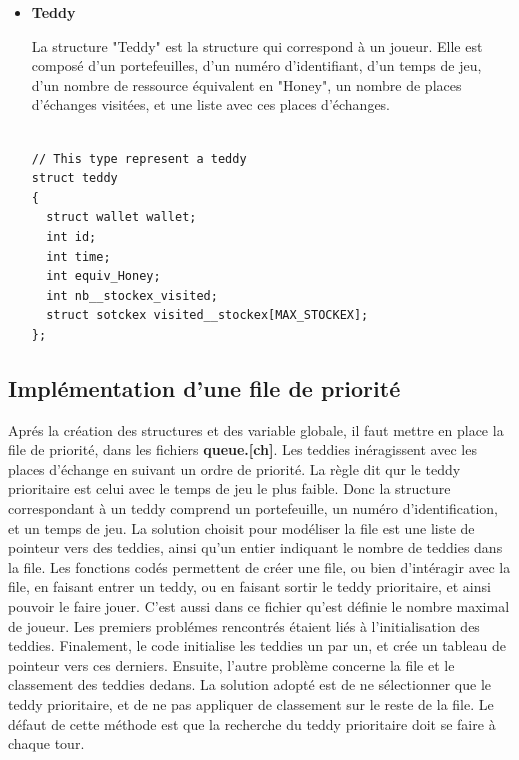 \documentclass{article}
\begin{document}
\begin{itemize}
\begin{lstlisting}
// This type represent a queue
struct queue
{
  struct teddy* list[MAX_PLYR]; 
  int nbr_of_teddies;
};
\end{lstlisting}

\item\textbf{Teddy}

La structure "Teddy" est la structure qui correspond \`a un joueur.
Elle est compos\'e d'un portefeuilles, d'un num\'ero d'identifiant, d'un temps de jeu, d'un nombre de ressource \'equivalent en "Honey", 
un nombre de places d'\'echanges visit\'ees, et une liste avec ces places d'\'echanges.

\begin{lstlisting}

// This type represent a teddy
struct teddy
{
  struct wallet wallet;
  int id;
  int time;
  int equiv_Honey;
  int nb__stockex_visited;
  struct sotckex visited__stockex[MAX_STOCKEX];
};
\end{lstlisting}

\end{itemize}

\subsection{Impl\'ementation d'une file de priorité}
Apr\'es la cr\'eation des structures et des variable globale, il faut mettre en place la file de priorit\'e, dans les fichiers \textbf{queue.[ch]}. Les teddies in\'eragissent avec les places d'\'echange en suivant un ordre de priorit\'e. La r\`egle dit qur le teddy prioritaire est celui avec le temps de jeu le plus faible. 
Donc la structure correspondant \`a un teddy comprend un portefeuille, un num\'ero d'identification, et un temps de jeu. 
La solution choisit pour mod\'eliser la file est une liste de pointeur vers des teddies, ainsi qu'un entier indiquant le nombre de teddies dans la file. 
Les fonctions cod\'es permettent de cr\'eer une file, ou bien d'int\'eragir avec la file, en faisant entrer un teddy, ou en faisant sortir le teddy prioritaire, et ainsi pouvoir le faire jouer. 
C'est aussi dans ce fichier qu'est d\'efinie le nombre maximal de joueur.
Les premiers probl\'emes rencontr\'es \'etaient li\'es \`a l'initialisation des teddies. Finalement, le code initialise les teddies un par un, et cr\'ee un tableau de pointeur vers ces derniers.
Ensuite, l'autre probl\`eme concerne la file et le classement des teddies dedans.
La solution adopt\'e est de ne s\'electionner que le teddy prioritaire, et de ne pas appliquer de classement sur le reste de la file. Le d\'efaut de cette m\'ethode est que la recherche du teddy prioritaire doit se faire \`a chaque tour.  
\end{document}
